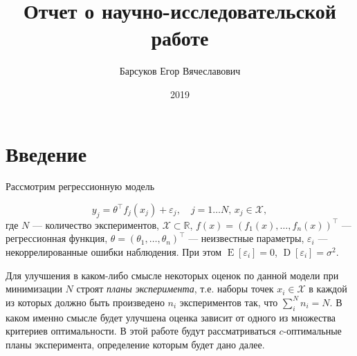\documentclass[specialist,
               substylefile = spbu.rtx,
               subf,href,colorlinks=true, 12pt]{disser}
\theoremstyle{definition}
\DeclareMathOperator*{\E}{\mathrm{E}}
\DeclareMathOperator*{\D}{\mathrm{D}}
\begin{document}

\title{Отчет о научно-исследовательской работе}


\author{Барсуков Егор Вячеславович}



\date{2019}

\maketitle

\tableofcontents

\chapter*{Введение}

  Рассмотрим регрессионную модель

  \begin{equation}
  \label{eq:regres}
    y_j = \theta^\top f_j(x_j) + \varepsilon_j, \quad j = 1 \ldots N, \, x_j \in \mathcal{X},
  \end{equation}
  где $N$ --- количество экспериментов, $\mathcal{X} \subset \mathbb{R}$, $f(x) = \left(f_1(x), \ldots, f_n(x) \right)^\top$ --- регрессионная функция, $\theta = \left( \theta_1, \ldots, \theta_n \right)^\top$ --- неизвестные параметры, $\varepsilon_i$ ---  некоррелированные ошибки наблюдения. При этом $\E [\varepsilon_i] = 0$, $\D [\varepsilon_i] = \sigma^2$.
  
  Для улучшения в каком-либо смысле некоторых оценок по данной модели при минимизации $N$  строят \textit{планы эксперимента}, т.е. наборы точек $x_i \in \mathcal{X}$ в каждой из которых должно быть произведено $n_i$ экспериментов так, что $\sum^N_i n_i = N$. В каком именно смысле будет улучшена оценка зависит от одного из множества критериев оптимальности. В этой работе будут рассматриваться $c$-оптимальные планы эксперимента, определение которым будет дано далее.
  
\end{document}
